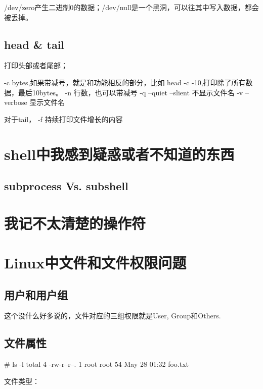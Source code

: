 /dev/zero产生二进制0的数据；/dev/null是一个黑洞，可以往其中写入数据，都会被丢掉。


\subsection{head \& tail}

打印头部或者尾部；

-c bytes,如果带减号，就是和功能相反的部分，比如 head -c -10,打印除了所有数据，最后10bytes。
-n 行数，也可以带减号
-q --quiet --slient 不显示文件名
-v --verbose 显示文件名


对于tail， -f 持续打印文件增长的内容


\section{shell中我感到疑惑或者不知道的东西}


\subsection{subprocess Vs. subshell}


\section{我记不太清楚的操作符}

\section{Linux中文件和文件权限问题}

\subsection{用户和用户组}

这个没什么好多说的，文件对应的三组权限就是User, Group和Others.

\subsection{文件属性}

\begin{Bash}
# ls -l
total 4
-rw-r--r--. 1 root root 54 May 28 01:32 foo.txt
\end{Bash}

文件类型：

